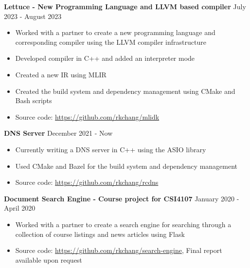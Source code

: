 \documentclass[10pt]{article}
\begin{document}
\textbf{Lettuce - New Programming Language and LLVM based compiler} \hfill July 2023 - August 2023
\begin{itemize}[noitemsep]
    \item Worked with a partner to create a new programming language and corresponding compiler using the LLVM compiler infrastructure
    \item Developed compiler in C++ and added an interpreter mode
    \item Created a new IR using MLIR
    \item Created the build system and dependency management using CMake and Bash scripts
    \item Source code: \url{https://github.com/rkchang/mlidk}
\end{itemize}

\textbf{DNS Server} \hfill December 2021 - Now
\begin{itemize}[noitemsep]
    \item Currently writing a DNS server in C++ using the ASIO library
    \item Used CMake and Bazel for the build system and dependency management
    \item Source code: \url{https://github.com/rkchang/rcdns}
\end{itemize}

\textbf{Document Search Engine - Course project for CSI4107} \hfill January 2020 - April 2020
\begin{itemize}[noitemsep]
    \item Worked with a partner to create a search engine for searching through a collection of course listings and news articles using Flask
    \item Source code: \url{https://github.com/rkchang/search-engine}, Final report available upon request
\end{itemize}
\end{document}
